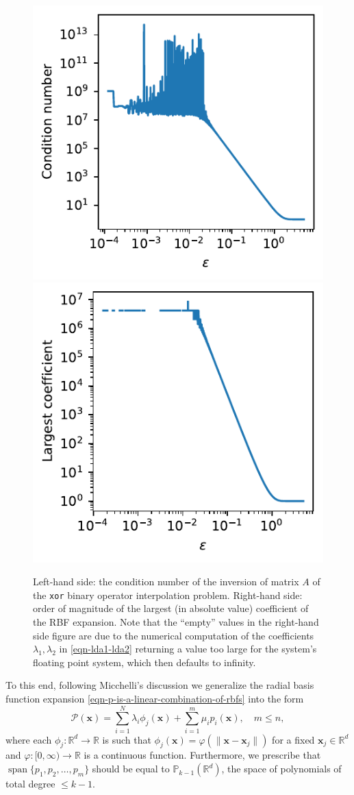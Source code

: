 \documentclass[12pt]{report} %
\newcommand{\tmmathbf}[1]{\ensuremath{\boldsymbol{#1}}}
\newcommand{\tmop}[1]{\ensuremath{\operatorname{#1}}}
\begin{document}
\begin{figure}[ht]
  \centering
  {\includegraphics[width=.45\textwidth]{imagenes/xor/xor_conditioning_graph.pdf}}
  {\includegraphics[width=.45\textwidth]{imagenes/xor/xor_largest_coef_graph.pdf}}
  \caption{Left-hand side: the condition number of the inversion of matrix $A$ of the \texttt{xor} binary operator interpolation problem. Right-hand side: order of magnitude of the largest (in absolute value) coefficient of the RBF expansion. Note that the ``empty'' values in the right-hand side figure are due to the numerical computation of the coefficients $\lambda_1, \lambda_2$ in \eqref{eqn-lda1-lda2} returning a value too large for the system's floating point system, which then defaults to infinity.}
  \label{fig:xor-coefficients-conditioning}
\end{figure}

To this end, following Micchelli's discussion \cite{micchelli1984interpolation} we generalize the radial basis function expansion \eqref{eqn-p-is-a-linear-combination-of-rbfs} into the form
\begin{equation}
  \mathcal{P} (\tmmathbf{x}) = \sum_{i = 1}^N \lambda_i \phi_j (\tmmathbf{x})
  + \sum_{i = 1}^m \mu_i p_i (\tmmathbf{x}), \quad m \leq n,
  \label{eqn-rbf-poly}
\end{equation}
where each $\phi_j : \mathbb{R}^d \rightarrow \mathbb{R}$ is such that
$\phi_j (\tmmathbf{x}) = \varphi (\| \tmmathbf{x}-\tmmathbf{x}_j \|)$ for a
fixed $\tmmathbf{x}_j \in \mathbb{R}^d$ and $\varphi : [0, \infty) \rightarrow
  \mathbb{R}$ is a continuous function. Furthermore, we prescribe that
$\tmop{span} \{ p_1, p_2, \ldots, p_m \}$ should be equal to $\mathbb{P}_{k -
    1} (\mathbb{R}^d)$, the space of polynomials of total degree $\leq k - 1$.
\end{document}
